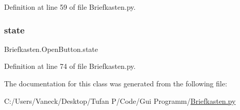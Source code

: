Definition at line 59 of file Briefkasten.\+py.

\mbox{\label{class_briefkasten_1_1_open_button_a8be5568f0d5b5fb9871e29275f423cf5}} 
\subsubsection{\texorpdfstring{state}{state}}
{\footnotesize\ttfamily Briefkasten.\+Open\+Button.\+state}



Definition at line 74 of file Briefkasten.\+py.



The documentation for this class was generated from the following file\+:\begin{DoxyCompactItemize}
\item 
C\+:/\+Users/\+Vaneck/\+Desktop/\+Tufan P/\+Code/\+Gui Programm/\mbox{\hyperlink{_briefkasten_8py}{Briefkasten.\+py}}\end{DoxyCompactItemize}
